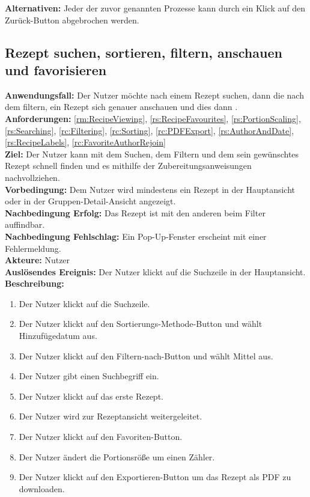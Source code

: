 \documentclass[parskip=full]{scrartcl}
\begin{document}
\textbf{Alternativen:} Jeder der zuvor genannten Prozesse kann durch ein Klick auf den Zurück-Button abgebrochen werden.
\newpage


\subsection{Rezept suchen, sortieren, filtern, anschauen und favorisieren}
\textbf{Anwendungsfall:} Der Nutzer möchte nach einem Rezept suchen, dann die  nach dem  filtern, ein Rezept sich genauer anschauen und dies dann .\\
\textbf{Anforderungen:} \ref{rm:RecipeViewing}, \ref{rs:RecipeFavourites}, \ref{rs:PortionScaling}, \ref{rs:Searching}, \ref{rc:Filtering}, \ref{rc:Sorting}, \ref{rc:PDFExport}, \ref{rs:AuthorAndDate}, \ref{rs:RecipeLabels}, \ref{rc:FavoriteAuthorRejoin}\\
\textbf{Ziel:} Der Nutzer kann mit dem Suchen, dem Filtern und dem  sein gewünschtes Rezept schnell finden und es mithilfe der Zubereitungsanweisungen nachvollziehen.\\
\textbf{Vorbedingung:} Dem Nutzer wird mindestens ein Rezept in der Hauptansicht oder in der Gruppen-Detail-Ansicht angezeigt.\\
\textbf{Nachbedingung Erfolg:} Das  Rezept ist mit den anderen   beim Filter   auffindbar.\\
\textbf{Nachbedingung Fehlschlag:} Ein Pop-Up-Fenster erscheint mit einer Fehlermeldung.\\
\textbf{Akteure:} Nutzer\\
\textbf{Auslösendes Ereignis:} Der Nutzer klickt auf die Suchzeile in der Hauptansicht.\\
\textbf{Beschreibung:}
\begin{enumerate}
    \item Der Nutzer klickt auf die Suchzeile.
    \item Der Nutzer klickt auf den Sortierungs-Methode-Button und wählt Hinzufügedatum aus.
    \item Der Nutzer klickt auf den Filtern-nach-Button und wählt  Mittel aus.
    \item Der Nutzer gibt einen Suchbegriff ein.
    \item Der Nutzer klickt auf das erste Rezept.
    \item Der Nutzer wird zur Rezeptansicht weitergeleitet.
    \item Der Nutzer klickt auf den Favoriten-Button.
    \item Der Nutzer ändert die Portionsröße um einen Zähler.
    \item Der Nutzer klickt auf den Exportieren-Button um das Rezept als PDF zu downloaden.
\end{enumerate}
\end{document}
